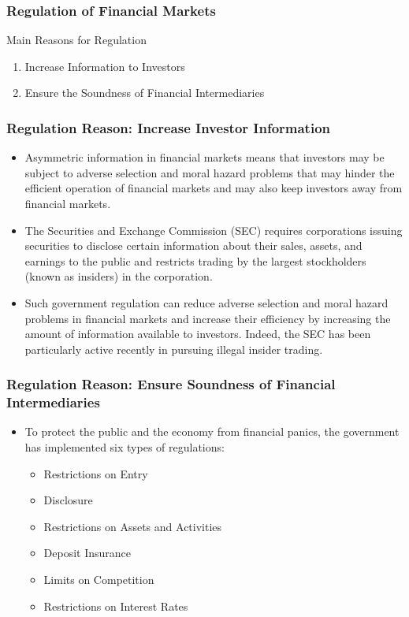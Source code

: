 \documentclass{beamer}
\begin{document}
\begin{frame}
\frametitle{Regulation of Financial Markets}
Main Reasons for Regulation
\begin{enumerate}
\item Increase Information to Investors
\item Ensure the Soundness of Financial Intermediaries
\end{enumerate}

\end{frame}


\begin{frame}
\frametitle{Regulation Reason: Increase Investor Information }

\begin{itemize}
\item Asymmetric information in financial markets means that investors may be subject to adverse selection and moral hazard problems that may hinder the efficient operation of financial markets and may also keep investors away from financial markets.

\item The Securities and Exchange Commission (SEC) requires corporations issuing securities to disclose certain information about their sales, assets, and earnings to the public and restricts trading by the largest stockholders (known as insiders) in the corporation.

\item Such government regulation can reduce adverse selection and moral hazard problems in financial markets and increase their efficiency by increasing the amount of information available to investors. Indeed, the SEC has been particularly active recently in pursuing illegal insider trading.

\end{itemize}
\end{frame}

\begin{frame}
\frametitle{Regulation Reason: Ensure Soundness of Financial Intermediaries}

\begin{itemize}
\item To protect the public and the economy from financial panics, the government has implemented six types of regulations:

\begin{itemize}
\item Restrictions on Entry
\item Disclosure
\item Restrictions on Assets and Activities
\item Deposit Insurance
\item Limits on Competition
\item Restrictions on Interest Rates
\end{itemize}

\end{itemize}
\end{frame}

\end{document}
